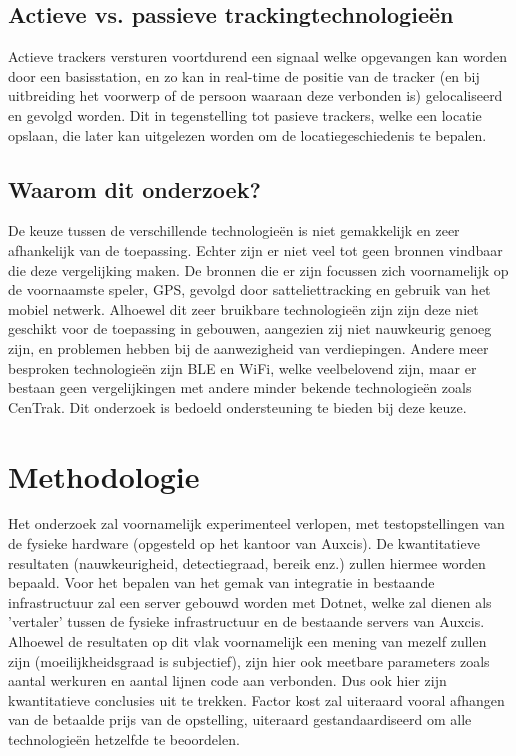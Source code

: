\subsection{Actieve vs. passieve trackingtechnologieën}

Actieve trackers versturen voortdurend een signaal welke opgevangen kan worden door een basisstation, en zo kan in real-time de positie van de tracker (en bij uitbreiding het voorwerp of de persoon waaraan deze verbonden is) gelocaliseerd en gevolgd worden.
Dit in tegenstelling tot pasieve trackers, welke een locatie opslaan, die later kan uitgelezen worden om de locatiegeschiedenis te bepalen. \autocite{Rosenfeld2017}

\subsection{Waarom dit onderzoek?}
De keuze tussen de verschillende technologieën is niet gemakkelijk en zeer afhankelijk van de toepassing. Echter zijn er niet veel tot geen bronnen vindbaar die deze vergelijking maken. De bronnen die er zijn focussen zich voornamelijk op de voornaamste speler, GPS, gevolgd door satteliettracking en gebruik van het mobiel netwerk. Alhoewel dit zeer bruikbare technologieën zijn zijn deze niet geschikt voor de toepassing in gebouwen, aangezien zij niet nauwkeurig genoeg zijn, en problemen hebben bij de aanwezigheid van verdiepingen. Andere meer besproken technologieën zijn BLE en WiFi, welke veelbelovend zijn, maar er bestaan geen vergelijkingen met andere minder bekende technologieën zoals CenTrak. Dit onderzoek is bedoeld ondersteuning te bieden bij deze keuze. \autocite{Deloitte2021} \autocite{Nijhawan2021}

\section{Methodologie}
\label{sec:methodologie}

Het onderzoek zal voornamelijk experimenteel verlopen, met testopstellingen van de fysieke hardware (opgesteld op het kantoor van Auxcis). De kwantitatieve resultaten (nauwkeurigheid, detectiegraad, bereik enz.) zullen hiermee worden bepaald. Voor het bepalen van het gemak van integratie in bestaande infrastructuur zal een server gebouwd worden met Dotnet, welke zal dienen als 'vertaler' tussen de fysieke infrastructuur en de bestaande servers van Auxcis. Alhoewel de resultaten op dit vlak voornamelijk een mening van mezelf zullen zijn (moeilijkheidsgraad is subjectief), zijn hier ook meetbare parameters zoals aantal werkuren en aantal lijnen code aan verbonden. Dus ook hier zijn kwantitatieve conclusies uit te trekken. Factor kost zal uiteraard vooral afhangen van de betaalde prijs van de opstelling, uiteraard gestandaardiseerd om alle technologieën hetzelfde te beoordelen.

